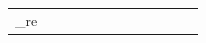 \documentclass[conference]{IEEEtran}
\begin{document}
\begin{figure}
\begin{center}
\begin{tabular}{| x{1.11cm} | x{.75cm} | x{.75cm} || x{1.11cm} | x{.75cm} | x{.75cm} || x{1.11cm} | x{.75cm} | x{.75cm} || x{1.11cm} | x{.75cm} | x{.75cm} |}
_re
\end{tabular}
\end{center}
\end{figure}
\end{document}
